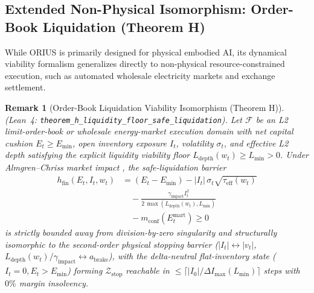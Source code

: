 \documentclass[conference]{IEEEtran}
\newtheorem{remark}{Remark}
\begin{document}
\subsection{Extended Non-Physical Isomorphism: Order-Book Liquidation (Theorem H)}
While ORIUS is primarily designed for physical embodied AI, its dynamical viability formalism generalizes directly to non-physical resource-constrained execution, such as automated wholesale electricity markets and exchange settlement.
\begin{remark}[Order-Book Liquidation Viability Isomorphism (Theorem H)]
\label{rem:financial_flash_crash}
(Lean~4: \texttt{theorem\_h\_\allowbreak liquidity\_\allowbreak floor\_\allowbreak safe\_\allowbreak liquidation}). Let $\mathcal{F}$ be an L2 limit-order-book or wholesale energy-market execution domain with net capital cushion $E_t \ge E_{\min}$, open inventory exposure $I_t$, volatility $\sigma_t$, and effective L2 depth satisfying the explicit liquidity viability floor $L_{\mathrm{depth}}(w_t) \ge L_{\min} > 0$. Under Almgren--Chriss market impact \cite{almgren_chriss_2001}, the safe-liquidation barrier
\begin{equation}
\begin{aligned}
h_{\mathrm{fin}}(E_t, I_t, w_t) &= (E_t - E_{\min}) - |I_t|\,\sigma_t \sqrt{\tau_{\mathrm{eff}}(w_t)} \\
&\quad - \frac{\gamma_{\mathrm{impact}} I_t^2}{2\,\max(L_{\mathrm{depth}}(w_t), L_{\min})} \\
&\quad - m_{\mathrm{conf}}(E_t^{\mathrm{mart}}) \ge 0
\end{aligned}
\end{equation}
is strictly bounded away from division-by-zero singularity and structurally isomorphic to the second-order physical stopping barrier ($|I_t| \leftrightarrow |v_t|$, $L_{\mathrm{depth}}(w_t)/\gamma_{\mathrm{impact}} \leftrightarrow a_{\mathrm{brake}}$), with the delta-neutral flat-inventory state ($I_t = 0, E_t > E_{\min}$) forming $\mathcal{Z}_{\mathrm{stop}}$ reachable in $\le \lceil |I_0|/\Delta I_{\max}(L_{\min})\rceil$ steps with $0\%$ margin insolvency.
\end{remark}
\end{document}
